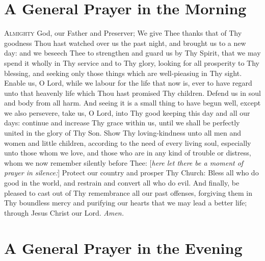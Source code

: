 \section*{A General Prayer in the Morning}

\lettrine{A}{lmighty} God, our Father and Preserver; We give Thee thanks that of Thy goodness Thou hast watched over us the past night, and brought us to a new day: and we beseech Thee to strengthen and guard us by Thy Spirit, that we may spend it wholly in Thy service and to Thy glory, looking for all prosperity to Thy blessing, and seeking only those things which are well-pieasiug in Thy sight.
Enable us, O Lord, while we labour for the life that now is, ever to have regard unto that heavenly life which Thou hast promised Thy children.
Defend us in soul and body from all harm.
And seeing it is a small thing to have begun well, except we also persevere, take us, O Lord, into Thy good keeping this day and all our days: continue and increase Thy grace within us, until we shall be perfectly united in the glory of Thy Son.
Show Thy loving-kindness unto all men and women and little children, according to the need of every living soul, especially unto those whom we love, and those who are in any kind of trouble or distress, whom we now remember silently before Thee: [\textit{here let there be a moment of prayer in silence:}] Protect our country and prosper Thy Church: Bless all who do good in the world, and restrain and convert all who do evil.
And finally, be pleased to cast out of Thy remembrance all our past offenses, forgiving them in Thy boundless mercy and purifying our hearts that we may lead a better life; through Jesus Christ our Lord.
\textit{Amen.}

\section*{A General Prayer in the Evening}

